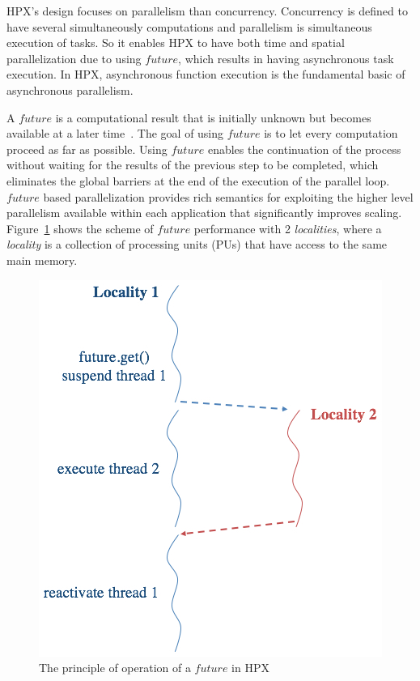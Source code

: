 \documentclass[conference]{IEEEtran}
\begin{document}
HPX's design focuses on parallelism than concurrency. Concurrency is defined to have several simultaneously computations and parallelism is simultaneous execution of tasks\cite{r15}. So it enables HPX to have both time and spatial parallelization \cite{r19} due to using \textit{$future$}, which results in having asynchronous task execution. In HPX, asynchronous function execution is the fundamental basic of asynchronous parallelism.

A \textit{$future$} is a computational result that is initially unknown but becomes available at a later time~\cite{r20}. The goal of using \textit{$future$} is to let every computation proceed as far as possible. Using \textit{$future$} enables the continuation of the process without waiting for the results of the previous step to be completed, which eliminates the global barriers at the end of the execution of the parallel loop. \textit{$future$} based parallelization provides rich semantics for exploiting the higher level parallelism available within each application that significantly improves scaling. Figure~\ref{f4} shows the scheme of \textit{$future$} performance with 2 \textit{localities}, where a \textit{locality} is a collection of processing units (PUs) that have access to the same main memory. 


\begin{figure} [!h]
\captionsetup{justification=centering}
\begin{center}
\centering
\includegraphics[width=0.75\columnwidth]{Pictures/f4a.jpg}
\caption {The principle of operation of a \textit{$future$} in HPX}
\label{f4}
\end{center}
\end{figure}
\end{document}

